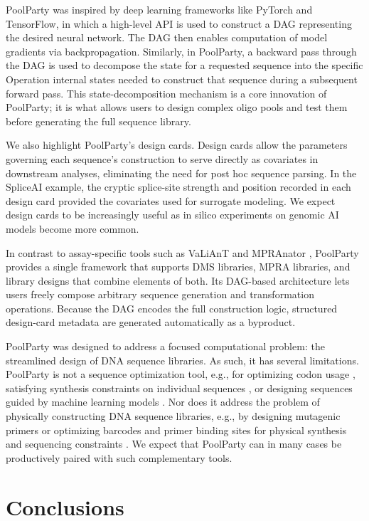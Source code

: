 \documentclass[twoside]{kinneylab_preprintstyle}
\begin{document}
PoolParty was inspired by deep learning frameworks like PyTorch and TensorFlow, in which a high-level API is used to construct a DAG representing the desired neural network. The DAG then enables computation of model gradients via backpropagation. Similarly, in PoolParty, a backward pass through the DAG is used to decompose the state for a requested sequence into the specific Operation internal states needed to construct that sequence during a subsequent forward pass. This state-decomposition mechanism is a core innovation of PoolParty; it is what allows users to design complex oligo pools and test them before generating the full sequence library.

We also highlight PoolParty's design cards. Design cards allow the parameters governing each sequence's construction to serve directly as covariates in downstream analyses, eliminating the need for post hoc sequence parsing. In the SpliceAI example, the cryptic splice-site strength and position recorded in each design card provided the covariates used for surrogate modeling. We expect design cards to be increasingly useful as in silico experiments on genomic AI models become more common.

In contrast to assay-specific tools such as VaLiAnT \citep{Barbon2022th} and MPRAnator \citep{GeorgakopoulosSoares2017gb}, PoolParty provides a single framework that supports DMS libraries, MPRA libraries, and library designs that combine elements of both. Its DAG-based architecture lets users freely compose arbitrary sequence generation and transformation operations. Because the DAG encodes the full construction logic, structured design-card metadata are generated automatically as a byproduct.

PoolParty was designed to address a focused computational problem: the streamlined design of DNA sequence libraries. As such, it has several limitations. PoolParty is not a sequence optimization tool, e.g., for optimizing codon usage \citep{Swainston2017rb}, satisfying synthesis constraints on individual sequences \citep{Zulkower2020jk}, or designing sequences guided by machine learning models \citep{Schreiber2025ledidi}. Nor does it address the problem of physically constructing DNA sequence libraries, e.g., by designing mutagenic primers \citep{Hiraga2021yg} or optimizing barcodes and primer binding sites for physical synthesis and sequencing constraints \citep{Hossain2024oc}. We expect that PoolParty can in many cases be productively paired with such complementary tools.

\section*{Conclusions}
\end{document}
